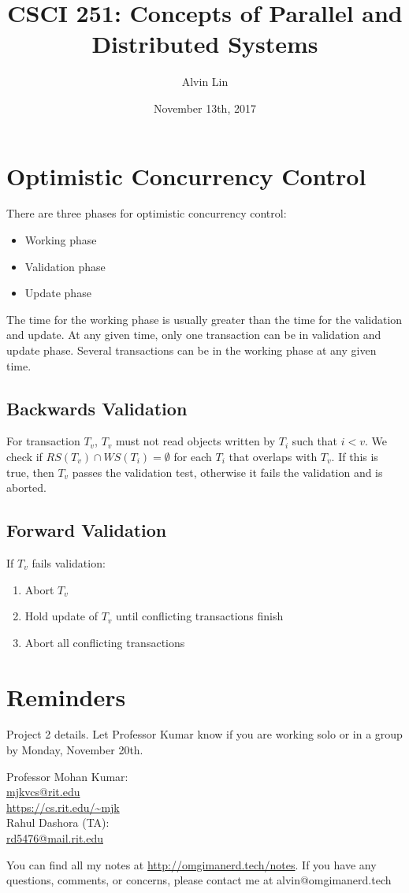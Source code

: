 \documentclass{math}
\title{CSCI 251: Concepts of Parallel and Distributed Systems}
\author{Alvin Lin}
\date{November 13th, 2017}
\begin{document}
\maketitle

\section*{Optimistic Concurrency Control}
There are three phases for optimistic concurrency control:
\begin{itemize}
  \item Working phase
  \item Validation phase
  \item Update phase
\end{itemize}
The time for the working phase is usually greater than the time for the
validation and update. At any given time, only one transaction can be in
validation and update phase. Several transactions can be in the working phase
at any given time.

\subsection*{Backwards Validation}
For transaction \( T_v \), \( T_v \) must not read objects written by \( T_i \)
such that \( i<v \). We check if \( RS(T_v)\cap WS(T_i) = \emptyset \) for each
\( T_i \) that overlaps with \( T_v \). If this is true, then \( T_v \) passes
the validation test, otherwise it fails the validation and is aborted.

\subsection*{Forward Validation}
If \( T_v \) fails validation:
\begin{enumerate}
  \item Abort \( T_v \)
  \item Hold update of \( T_v \) until conflicting transactions finish
  \item Abort all conflicting transactions
\end{enumerate}

\section*{Reminders}
Project 2 details. Let Professor Kumar know if you are working solo or in a
group by Monday, November 20th.

\noindent Professor Mohan Kumar: \\
\url{mjkvcs@rit.edu} \\
\url{https://cs.rit.edu/~mjk} \\

\noindent Rahul Dashora (TA): \\
\url{rd5476@mail.rit.edu} \\

\begin{center}
  You can find all my notes at \url{http://omgimanerd.tech/notes}. If you have
  any questions, comments, or concerns, please contact me at
  alvin@omgimanerd.tech
\end{center}
\end{document}
